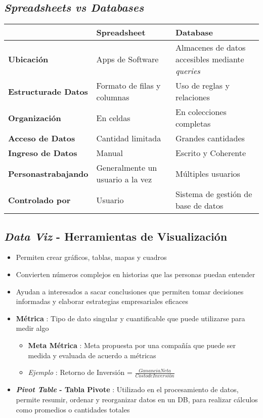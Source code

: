 \subsection{\textit{Spreadsheets vs Databases}}
\begin{table}
    \centering
    \begin{tabular}{|p{3.5cm}|p{5.5cm}|p{5.5cm}|}
        \hline
        & \textbf{Spreadsheet} & \textbf{Database} \\
        \hline
        \textbf{Ubicación} & Apps de Software & Almacenes de datos accesibles mediante \textit{queries} \\
        \hline
        \textbf{Estructura\break de Datos} & Formato de filas y columnas & Uso de reglas y relaciones \\
        \hline
        \textbf{Organización} & En celdas & En colecciones completas \\
        \hline
        \textbf{Acceso de Datos} & Cantidad limitada & Grandes cantidades \\
        \hline
        \textbf{Ingreso de Datos} & Manual & Escrito y Coherente \\
        \hline
        \textbf{Personas\break trabajando} & Generalmente un usuario a la vez & Múltiples usuarios \\
        \hline
        \textbf{Controlado por} & Usuario & Sistema de gestión de base de datos \\
        \hline
    \end{tabular}
\end{table}

\subsection{\textit{Data Viz} - Herramientas de Visualización}
\begin{itemize}
    \item {Permiten crear gráficos, tablas, mapas y cuadros}
    \item {Convierten números complejos en historias que las personas puedan entender}
    \item {Ayudan a interesados a sacar conclusiones que permiten tomar decisiones informadas y elaborar estrategias empresariales eficaces}
    \item {\textbf{Métrica} : Tipo de dato singular y cuantificable que puede utilizarse para medir algo
    \begin{itemize}
        \item {\textbf{Meta Métrica} : Meta propuesta por una compañía que puede ser medida y evaluada de acuerdo a métricas}
        \item {\textit{Ejemplo} : Retorno de Inversión = $\frac{Ganancia Neta}{Costo de Inversión}$}
    \end{itemize}}
    \item {\textbf{\textit{Pivot Table} - Tabla Pivote} : Utilizado en el procesamiento de datos, permite resumir, ordenar y reorganizar datos en un DB, para realizar cálculos como promedios o cantidades totales}
\end{itemize}

